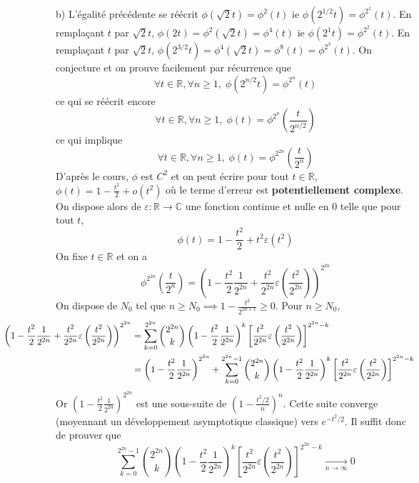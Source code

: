 \documentclass{report}
\begin{document}
b) L'égalité précédente se réécrit $\phi(\sqrt 2 t) = \phi^2(t)$ ie $\phi(2^{1/2} t) = \phi^{2^1}(t)$.\newline
En remplaçant $t$ par $\sqrt 2 t$, $\phi(2t)=\phi^2(\sqrt 2t)=\phi^4(t)$ ie $\phi(2^1t)=\phi^{2^2}(t)$. \newline 
En remplaçant $t$ par $\sqrt 2 t$, $\phi(2^{3/2}t) = \phi^4(\sqrt 2 t)=\phi^8(t)=\phi^{2^3}(t)$. \newline
On conjecture et on prouve facilement par récurrence que $$ \forall t \in \mathbb R, \forall n\geq 1,\; \phi(2^{n/2}t) = \phi^{2^n}(t)$$ ce qui se réécrit encore $$ \forall t \in \mathbb R, \forall n\geq 1,\; \phi(t) = \phi^{2^n}(\frac{t}{2^{n/2}})$$ ce qui implique $$\forall t \in \mathbb R, \forall n\geq 1,\; \phi(t) = \phi^{2^{2n}}(\frac{t}{2^{n}})$$
D'après le cours, $\phi$ est $C^2$ et on peut écrire pour tout $t\in \mathbb R$, $\phi(t)=1-\frac{t^2}{2}+o(t^2)$ où le terme d'erreur est \textbf{potentiellement complexe}. On dispose alors de $\varepsilon:\mathbb R\to \mathbb C$ une fonction continue et nulle en $0$ telle que pour tout $t$, $$\phi(t)=1-\frac{t^2}{2}+t^2\varepsilon(t^2)$$
On fixe $t\in \mathbb R$ et on a $$\phi^{2^{2n}}(\frac{t}{2^{n}}) = \left(1-\frac{t^2}{2}\frac{1}{2^{2n}}+\frac{t^2}{2^{2n}}\varepsilon\left(\frac{t^2}{2^{2n}} \right) \right)^{2^{2n}}$$
On dispose de $N_0$ tel que $n\geq N_0 \implies 1-\frac{t^2}{2^{2n+1}} \geq 0 $. Pour $n\geq N_0$, 
$$\begin{aligned} \hspace{-2cm} \left(1-\frac{t^2}{2}\frac{1}{2^{2n}}+\frac{t^2}{2^{2n}}\varepsilon\left(\frac{t^2}{2^{2n}} \right) \right)^{2^{2n}}
&= \sum_{k=0}^{2^{2n}} \binom{2^{2n}}{k} \left( 1-\frac{t^2}{2}\frac{1}{2^{2n}}\right)^k \left[\frac{t^2}{2^{2n}}\varepsilon\left(\frac{t^2}{2^{2n}} \right) \right]^{2^{2n}-k} \\
&= \left( 1-\frac{t^2}{2}\frac{1}{2^{2n}}\right)^{2^{2n}} + \sum_{k=0}^{2^{2n}-1} \binom{2^{2n}}{k} \left( 1-\frac{t^2}{2}\frac{1}{2^{2n}}\right)^k \left[\frac{t^2}{2^{2n}}\varepsilon\left(\frac{t^2}{2^{2n}} \right) \right]^{2^{2n}-k}
\end{aligned}$$
Or $\left( 1-\frac{t^2}{2}\frac{1}{2^{2n}}\right)^{2^{2n}}$ est une sous-suite de $(1-\frac{t^2/2}{n})^n$. Cette suite converge (moyennant un développement asymptotique classique) vers $e^{-t^2/2}$.
Il suffit donc de prouver que $$\sum_{k=0}^{2^{2n}-1} \binom{2^{2n}}{k} \left( 1-\frac{t^2}{2}\frac{1}{2^{2n}}\right)^k \left[\frac{t^2}{2^{2n}}\varepsilon\left(\frac{t^2}{2^{2n}} \right) \right]^{2^{2n}-k} \xrightarrow[n\to \infty]{}0$$
\end{document}
